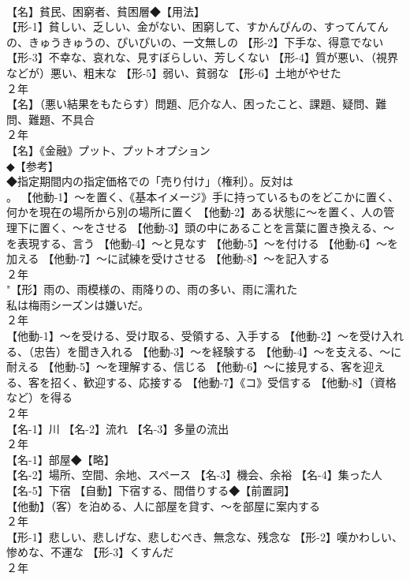 \documentclass[8pt]{extreport}
\begin{document}
\begin{CJK}{UTF8}{min}
\\	【名】貧民、困窮者、貧困層◆【用法】
\\	【形-1】貧しい、乏しい、金がない、困窮して、すかんぴんの、すってんてんの、きゅうきゅうの、ぴいぴいの、一文無しの 【形-2】下手な、得意でない 【形-3】不幸な、哀れな、見すぼらしい、芳しくない 【形-4】質が悪い、（視界などが）悪い、粗末な 【形-5】弱い、貧弱な 【形-6】土地がやせた
\\	２年	
\\	【名】（悪い結果をもたらす）問題、厄介な人、困ったこと、課題、疑問、難問、難題、不具合
\\	２年	
\\	【名】《金融》プット、プットオプション
\\	◆【参考】
\\	◆指定期間内の指定価格での「売り付け」（権利）。反対は 
\\	。 【他動-1】～を置く、《基本イメージ》手に持っているものをどこかに置く、何かを現在の場所から別の場所に置く 【他動-2】ある状態に～を置く、人の管理下に置く、～をさせる 【他動-3】頭の中にあることを言葉に置き換える、～を表現する、言う 【他動-4】～と見なす 【他動-5】～を付ける 【他動-6】～を加える 【他動-7】～に試練を受けさせる 【他動-8】～を記入する
\\	２年	
\\	"【形】雨の、雨模様の、雨降りの、雨の多い、雨に濡れた 
\\	私は梅雨シーズンは嫌いだ。
\\	２年	
\\	【他動-1】～を受ける、受け取る、受領する、入手する 【他動-2】～を受け入れる、（忠告）を聞き入れる 【他動-3】～を経験する 【他動-4】～を支える、～に耐える 【他動-5】～を理解する、信じる 【他動-6】～に接見する、客を迎える、客を招く、歓迎する、応接する 【他動-7】《コ》受信する 【他動-8】（資格など）を得る
\\	２年	
\\	【名-1】川 【名-2】流れ 【名-3】多量の流出
\\	２年	
\\	【名-1】部屋◆【略】
\\	【名-2】場所、空間、余地、スペース 【名-3】機会、余裕 【名-4】集った人 【名-5】下宿 【自動】下宿する、間借りする◆【前置詞】
\\	【他動】（客）を泊める、人に部屋を貸す、～を部屋に案内する
\\	２年	
\\	【形-1】悲しい、悲しげな、悲しむべき、無念な、残念な 【形-2】嘆かわしい、惨めな、不運な 【形-3】くすんだ
\\	２年	

\end{CJK}
\end{document}
